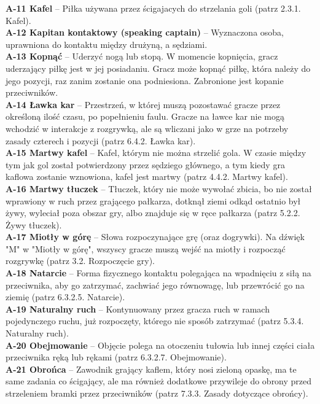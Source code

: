 \documentclass[12pt,a4paper]{article}
\begin{document}
\textbf{A-11 Kafel} – Piłka używana przez ścigajacych do strzelania goli (patrz 2.3.1. Kafel).\\
\textbf{A-12 Kapitan kontaktowy (speaking captain)} – Wyznaczona osoba, uprawniona do kontaktu między drużyną, a sędziami.\\
\textbf{A-13 Kopnąć} – Uderzyć nogą lub stopą. W momencie kopnięcia, gracz uderzający piłkę jest w jej posiadaniu. Gracz może kopnąć piłkę, która należy do jego pozycji, raz zanim zostanie ona podniesiona. Zabronione jest kopanie przeciwników.\\
\textbf{A-14 Ławka kar} – Przestrzeń, w której muszą pozostawać gracze przez określoną ilość czasu, po popełnieniu faulu. Gracze na ławce kar nie mogą wchodzić w interakcje z rozgrywką, ale są wliczani jako w grze na potrzeby zasady czterech i pozycji (patrz 6.4.2. Ławka kar).\\
\textbf{A-15 Martwy kafel} – Kafel, którym nie można strzelić gola. W czasie między tym jak gol został potwierdzony przez sędziego głównego, a tym kiedy gra kaflowa zostanie wznowiona, kafel jest martwy (patrz 4.4.2. Martwy kafel).\\
\textbf{A-16 Martwy tłuczek} – Tłuczek, który nie może wywołać zbicia, bo nie został wprawiony w ruch przez grającego pałkarza, dotknął ziemi odkąd ostatnio był żywy, wyleciał poza obszar gry, albo znajduje się w ręce pałkarza (patrz 5.2.2. Żywy tłuczek).\\
\textbf{A-17 Miotły w górę} – Słowa rozpoczynające grę (oraz dogrywki). Na dźwięk "M" w "Miotły w górę", wszyscy gracze muszą wejść na miotły i rozpocząć rozgrywkę (patrz 3.2. Rozpoczęcie gry).\\
\textbf{A-18 Natarcie} – Forma fizycznego kontaktu polegająca na wpadnięciu z siłą na przeciwnika, aby go zatrzymać, zachwiać jego równowagę, lub przewrócić go na ziemię (patrz 6.3.2.5. Natarcie).\\
\textbf{A-19 Naturalny ruch} – Kontynuowany przez gracza ruch w ramach pojedynczego ruchu, już rozpoczęty, którego nie sposób zatrzymać (patrz 5.3.4. Naturalny ruch).\\
\textbf{A-20 Obejmowanie} – Objęcie polega na otoczeniu tułowia lub innej części ciała przeciwnika ręką lub rękami (patrz 6.3.2.7. Obejmowanie).\\
\textbf{A-21 Obrońca} – Zawodnik grający kaflem, który nosi zieloną opaskę, ma te same zadania co ścigający, ale ma również dodatkowe przywileje do obrony przed strzeleniem bramki przez przeciwników (patrz 7.3.3. Zasady dotyczące obrońcy).\\
\end{document}
